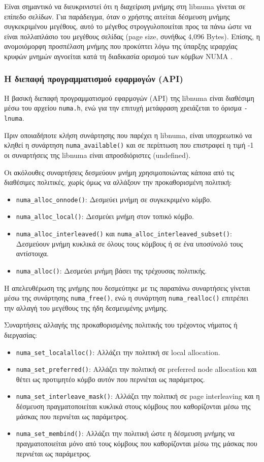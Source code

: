 Είναι σημαντικό να διευκρινιστεί ότι η διαχείριση μνήμης στη libnuma γίνεται σε επίπεδο σελίδων. Για παράδειγμα, όταν ο χρήστης αιτείται δέσμευση μνήμης συγκεκριμένου μεγέθους, αυτό το μέγεθος στρογγυλοποιείται προς τα πάνω ώστε να είναι πολλαπλάσιο του μεγέθους σελίδας (page size, συνήθως 4,096 Bytes). Επίσης, η ανομοιόμορφη προσπέλαση μνήμης που προκύπτει λόγω της ύπαρξης ιεραρχίας κρυφών μνημών αγνοείται κατά τη διαδικασία ορισμού των κόμβων NUMA \cite{numaman}.

\subsubsection{Η διεπαφή προγραμματισμού εφαρμογών (API)}
Η βασική διεπαφή προγραμματισμού εφαρμογών (API) της libnuma είναι διαθέσιμη μέσω του αρχείου \texttt{numa.h}, ενώ για την επιτυχή μετάφραση χρειάζεται το όρισμα \texttt{-lnuma}.

Πριν οποιαδήποτε κλήση συνάρτησης που παρέχει η libnuma, είναι υποχρεωτικό να κληθεί η συνάρτηση \texttt{numa\_available()} και σε περίπτωση που επιστραφεί η τιμή -1 οι συναρτήσεις της libnuma είναι απροσδιόριστες (undefined).

Οι ακόλουθες συναρτήσεις δεσμεύουν μνήμη χρησιμοποιώντας κάποια από τις διαθέσιμες πολιτικές, χωρίς όμως να αλλάξουν την προκαθορισμένη πολιτική:
\begin{itemize}
	\item \texttt{numa\_alloc\_onnode()}: Δεσμεύει μνήμη σε συγκεκριμένο κόμβο.
	\item \texttt{numa\_alloc\_local()}: Δεσμεύει μνήμη στον τοπικό κόμβο.
	\item \texttt{numa\_alloc\_interleaved()} και \texttt{numa\_alloc\_interleaved\_subset()}: Δεσμεύουν \newline μνήμη κυκλικά σε όλους τους κόμβους ή σε ένα υποσύνολό τους αντίστοιχα.
	\item \texttt{numa\_alloc()}: Δεσμεύει μνήμη βάσει της τρέχουσας πολιτικής.
\end{itemize}
Η απελευθέρωση της μνήμης που δεσμεύτηκε με τις παραπάνω συναρτήσεις γίνεται μέσω της συνάρτησης \texttt{numa\_free()}, ενώ η συνάρτηση \texttt{numa\_realloc()} επιτρέπει την αλλαγή του μεγέθους της ήδη δεσμευμένης μνήμης.

Συναρτήσεις αλλαγής της προκαθορισμένης πολιτικής του τρέχοντος νήματος ή διεργασίας:
\begin{itemize}
	\item \texttt{numa\_set\_localalloc()}: Αλλάζει την πολιτική σε local allocation.
	\item \texttt{numa\_set\_preferred()}: Αλλάζει την πολιτική σε preferred node allocation και θέτει ως προτιμητέο κόμβο αυτόν που περνιέται ως παράμετρος.
	\item \texttt{numa\_set\_interleave\_mask()}: Αλλάζει την πολιτική σε page interleaving και η δέσμευση πραγματοποιείται κυκλικά στους κόμβους που καθορίζονται μέσω της μάσκας που περνιέται ως παράμετρος.
	\item \texttt{numa\_set\_membind()}: Αλλάζει την πολιτική ώστε η δέσμευση μνήμης να πραγματοποιείται μόνο από τους κόμβους που καθορίζονται μέσω της μάσκας που περνιέται ως παράμετρος.
\end{itemize}

